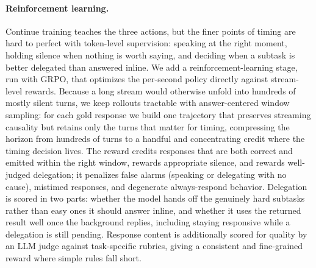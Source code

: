 \paragraph{\textbf{Reinforcement learning.}}
Continue training teaches the three actions, but the finer points of timing are hard to perfect with token-level supervision: speaking at the right moment, holding silence when nothing is worth saying, and deciding when a subtask is better delegated than answered inline. We add a reinforcement-learning stage, run with GRPO, that optimizes the per-second policy directly against stream-level rewards. Because a long stream would otherwise unfold into hundreds of mostly silent turns, we keep rollouts tractable with answer-centered window sampling: for each gold response we build one trajectory that preserves streaming causality but retains only the turns that matter for timing, compressing the horizon from hundreds of turns to a handful and concentrating credit where the timing decision lives.
The reward credits responses that are both correct and emitted within the right window, rewards appropriate silence, and rewards well-judged delegation; it penalizes false alarms (speaking or delegating with no cause), mistimed responses, and degenerate always-respond behavior. Delegation is scored in two parts: whether the model hands off the genuinely hard subtasks rather than easy ones it should answer inline, and whether it uses the returned result well once the background replies, including staying responsive while a delegation is still pending. Response content is additionally scored for quality by an LLM judge against task-specific rubrics, giving a consistent and fine-grained reward where simple rules fall short.


